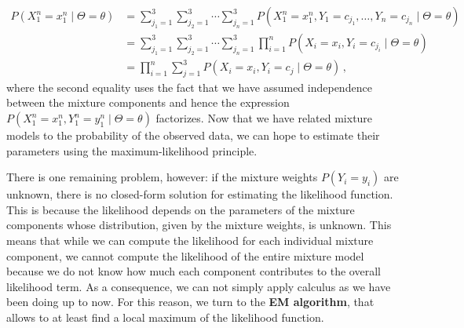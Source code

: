 \documentclass[a4paper,11pt,leqno]{report}\usepackage[]{graphicx}\usepackage[]{color}
\newcommand{\philip}[1]{ \textcolor{red}{\textbf{Philip:} #1}}
\newcommand{\chris}[1]{ \textcolor{blue}{\textbf{Chris:} #1}}
\begin{document}

\begin{align}
P(X_1^n=x_{1}^{n} \mid \Theta= \theta) &= \sum_{j_1=1}^3 \sum_{j_2=1}^3 \cdots \sum_{j_n=1}^3 P(X_1^n=x_{1}^{n}, Y_1=c_{j_1}, \ldots, Y_n=c_{j_n} \mid \Theta= \theta) \label{eq:marginal} \\
&= \sum_{j_1=1}^3 \sum_{j_2=1}^3 \cdots \sum_{j_n=1}^3 \prod_{i=1}^{n} P(X_{i}=x_{i},Y_{i}=c_{j_i} \mid  \Theta= \theta) \nonumber \\
&= \prod_{i=1}^{n} \sum_{j=1}^3 P(X_{i}=x_{i},Y_{i}=c_{j} \mid  \Theta= \theta) \, , \nonumber
\end{align}
where the second equality uses the fact that we have assumed independence between the mixture components and hence
the expression $P(X_1^n=x_1^n, Y_1^n=y_1^n \mid \Theta = \theta)$ factorizes.
Now that we have related mixture models to the probability of the observed data, we can hope to estimate
their parameters using the maximum-likelihood principle.

There is one remaining problem, however: if the mixture weights $P(Y_i=y_i)$ are unknown, there is no closed-form solution for estimating the likelihood function. This is because
the likelihood depends on the parameters of the mixture components whose distribution, given
by the mixture weights, is unknown. This means that while we can compute the likelihood for each
individual mixture component, we cannot compute the likelihood of the entire mixture model because we
do not know how much each component contributes to the overall likelihood term. As a consequence, we can not 
simply apply calculus as we have been doing up to now. For this reason, we turn to the \textbf{EM algorithm}, 
that allows to at least find a local maximum of the likelihood function.
\end{document}
